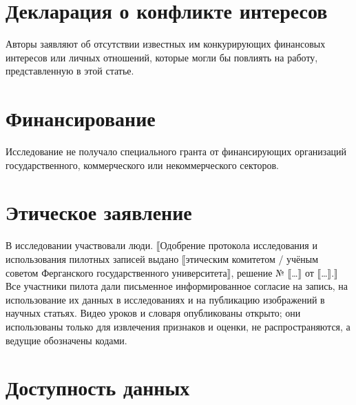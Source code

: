\hypertarget{ux434ux435ux43aux43bux430ux440ux430ux446ux438ux44f-ux43e-ux43aux43eux43dux444ux43bux438ux43aux442ux435-ux438ux43dux442ux435ux440ux435ux441ux43eux432}{%
\section{Декларация о конфликте интересов}\label{ux434ux435ux43aux43bux430ux440ux430ux446ux438ux44f-ux43e-ux43aux43eux43dux444ux43bux438ux43aux442ux435-ux438ux43dux442ux435ux440ux435ux441ux43eux432}}

Авторы заявляют об отсутствии известных им конкурирующих финансовых интересов или личных отношений, которые могли бы повлиять на работу, представленную в этой статье.

\hypertarget{ux444ux438ux43dux430ux43dux441ux438ux440ux43eux432ux430ux43dux438ux435}{%
\section{Финансирование}\label{ux444ux438ux43dux430ux43dux441ux438ux440ux43eux432ux430ux43dux438ux435}}

Исследование не получало специального гранта от финансирующих организаций государственного, коммерческого или некоммерческого секторов.

\hypertarget{ux44dux442ux438ux447ux435ux441ux43aux43eux435-ux437ux430ux44fux432ux43bux435ux43dux438ux435}{%
\section{Этическое заявление}\label{ux44dux442ux438ux447ux435ux441ux43aux43eux435-ux437ux430ux44fux432ux43bux435ux43dux438ux435}}

В исследовании участвовали люди. ⟦Одобрение протокола исследования и использования пилотных записей выдано ⟦этическим комитетом / учёным советом Ферганского государственного университета⟧, решение № ⟦\ldots⟧ от ⟦\ldots⟧.⟧ Все участники пилота дали письменное информированное согласие на запись, на использование их данных в исследованиях и на публикацию изображений в научных статьях. Видео уроков и словаря опубликованы открыто; они использованы только для извлечения признаков и оценки, не распространяются, а ведущие обозначены кодами.

\hypertarget{ux434ux43eux441ux442ux443ux43fux43dux43eux441ux442ux44c-ux434ux430ux43dux43dux44bux445}{%
\section{Доступность данных}\label{ux434ux43eux441ux442ux443ux43fux43dux43eux441ux442ux44c-ux434ux430ux43dux43dux44bux445}}

